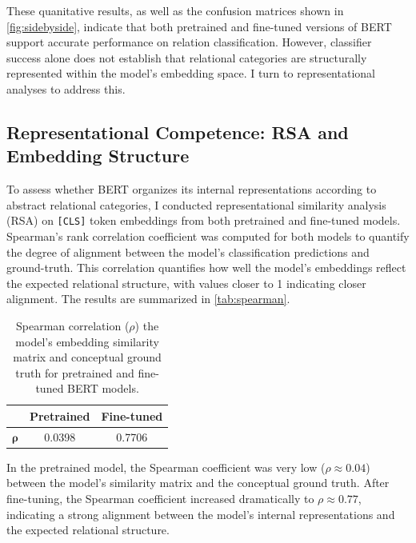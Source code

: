 \documentclass[stu,floatsintext]{apa7}
\begin{document}
These quanitative results, as well as the confusion matrices shown in \autoref{fig:sidebyside}, indicate that both pretrained and fine-tuned versions of BERT support accurate performance on relation classification. However, classifier success alone does not establish that relational categories are structurally represented within the model's embedding space. I turn to representational analyses to address this.

\subsection{Representational Competence: RSA and Embedding Structure}

To assess whether BERT organizes its internal representations according to abstract relational categories, I conducted representational similarity analysis (RSA) on \texttt{[CLS]} token embeddings from both pretrained and fine-tuned models. Spearman's rank correlation coefficient was computed for both models to quantify the degree of alignment between the model's classification predictions and ground-truth. This correlation quantifies how well the model's embeddings reflect the expected relational structure, with values closer to 1 indicating closer alignment. The results are summarized in \autoref{tab:spearman}.

\medskip
\begin{table}[H]
  \centering
  \caption{Spearman correlation ($\rho$) the model’s embedding similarity matrix and conceptual ground truth for pretrained and fine-tuned BERT models.}
  \label{tab:spearman}
  \begin{tabular}{|c|c|c|}
    \hline
    & \textbf{Pretrained} & \textbf{Fine-tuned} \\
    \hline
    \textbf{$\mathbf{\rho}$} & 0.0398 & 0.7706 \\
    \hline
  \end{tabular}
\end{table}

In the pretrained model, the Spearman coefficient was very low ($\rho \approx 0.04$) between the model's similarity matrix and the conceptual ground truth. After fine-tuning, the Spearman coefficient increased dramatically to $\rho \approx 0.77$, indicating a strong alignment between the model's internal representations and the expected relational structure.
\end{document}
